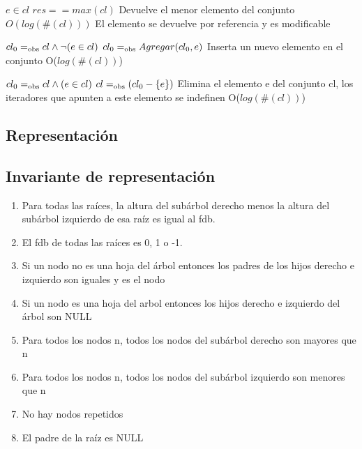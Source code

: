 {$e \in cl$}
{$res == max(cl)$}
{Devuelve el menor elemento del conjunto}
{$O(log(\#(cl)))$}
{El elemento se devuelve por referencia y es modificable}

{$cl_0 =_{\mathrm{obs}} cl \land \neg(e \in cl)$}
{$cl_0 =_{\mathrm{obs}} Agregar(cl_0, e)$}
{Inserta un nuevo elemento en el conjunto}
{O($log(\#(cl))$)}
{}

{$cl_0 =_{\mathrm{obs}} cl \land (e \in cl)$}
{$cl =_{\mathrm{obs}} (cl_0 - \{e\})$}
{Elimina el elemento e del conjunto cl, los iteradores que apunten a este elemento se indefinen}
{O($log(\#(cl))$)}
{}

\subsection{Representación}


\newpage
\subsection{Invariante de representación}

\begin{enumerate}
	\item Para todas las raíces, la altura del subárbol derecho menos la altura del subárbol izquierdo de esa raíz es igual al fdb.
	\item El fdb de todas las raíces es 0, 1 o -1.
	\item Si un nodo no es una hoja del árbol entonces los padres de los hijos derecho e izquierdo son iguales y es el nodo
	\item Si un nodo es una hoja del arbol entonces los hijos derecho e izquierdo del árbol son NULL
	\item Para todos los nodos n, todos los nodos del subárbol derecho son mayores que n
	\item Para todos los nodos n, todos los nodos del subárbol izquierdo son menores que n
	\item No hay nodos repetidos
	\item El padre de la raíz es NULL
\end{enumerate}

